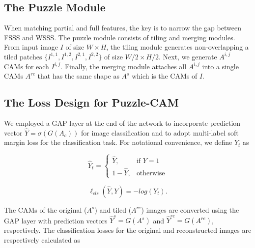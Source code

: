 \documentclass{article}
\begin{document}
\subsection{The Puzzle Module}
\label{ssec:module}
When matching partial and full features, the key is to narrow the gap between FSSS and WSSS.
The puzzle module consists of tiling and merging modules.
From input image $I$ of size $W\times H$, the tiling module generates non-overlapping a tiled patches $\{I^{1,1}, I^{1,2}, I^{2,1}, I^{2,2}\}$ of size $W/2 \times H/2$.
Next, we generate $A^{i,j}$ CAMs for each $I^{i,j}$.
Finally, the merging module attaches all $A^{i,j}$ into a single CAMs $A^{re}$ that has the same shape as $A^s$ which is the CAMs of $I$.


















\subsection{The Loss Design for Puzzle-CAM}
\label{ssec:loss}

We employed a GAP layer at the end of the network to incorporate prediction vector $\hat{Y} = \sigma(G(A_c))$ for image classification and to adopt multi-label soft margin loss for the classification task.
For notational convenience, we define $Y_t$ as

\begin{equation}\label{eq2}
    \hat{Y}_t = 
\begin{cases}
    \hat{Y}      ,& \text{if } Y = 1 \\
    1 - \hat{Y},  & \text{otherwise}
\end{cases}
\end{equation}

\begin{equation}\label{eq3}
\ell_{cls}(\hat{Y}, Y) = -log(Y_t).
\end{equation}



The CAMs of the original ($A^s$) and tiled ($A^{re}$) images are converted using the GAP layer with prediction vectors $\hat{Y}^{s} = G(A^{s})$ and $\hat{Y}^{re} = G(A^{re})$, respectively. 
The classification losses for the original and reconstructed images are respectively calculated as
\end{document}
